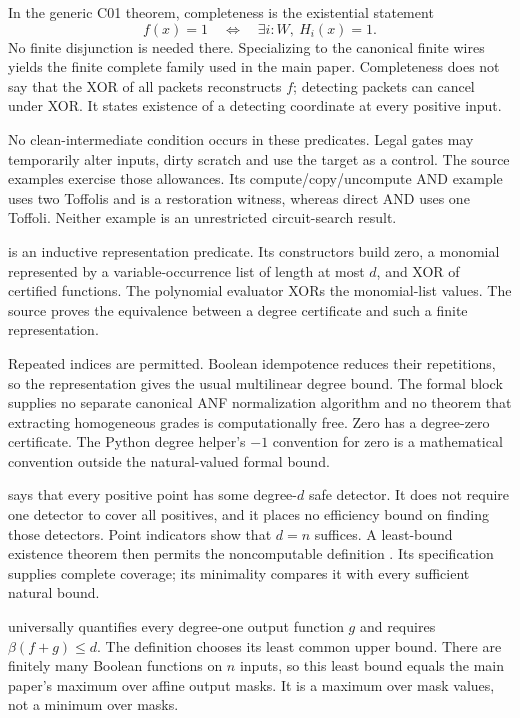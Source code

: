 In the generic C01 theorem, completeness is the existential statement
\[
 f(x)=1\quad\Longleftrightarrow\quad\exists i:W,\ H_i(x)=1.
\]
No finite disjunction is needed there. Specializing to the canonical finite
wires yields the finite complete family used in the main paper. Completeness
does not say that the XOR of all packets reconstructs $f$; detecting packets
can cancel under XOR. It states existence of a detecting coordinate at every
positive input.

No clean-intermediate condition occurs in these predicates. Legal gates may
temporarily alter inputs, dirty scratch and use the target as a control. The
source examples exercise those allowances. Its compute/copy/uncompute AND
example uses two Toffolis and is a restoration witness, whereas direct AND
uses one Toffoli. Neither example is an unrestricted circuit-search result.

 is an inductive representation predicate. Its constructors
build zero, a monomial represented by a variable-occurrence list of length
at most $d$, and XOR of certified functions. The polynomial evaluator XORs
the monomial-list values. The source proves the equivalence between a degree
certificate and such a finite representation.

Repeated indices are permitted. Boolean idempotence reduces their repetitions,
so the representation gives the usual multilinear degree bound. The formal
block supplies no separate canonical ANF normalization algorithm and no theorem
that extracting homogeneous grades is computationally free. Zero has a
degree-zero certificate. The Python degree helper's $-1$ convention for zero
is a mathematical convention outside the natural-valued formal bound.

 says that every positive point has some degree-$d$
safe detector. It does not require one detector to cover all positives, and
it places no efficiency bound on finding those detectors. Point indicators
show that $d=n$ suffices. A least-bound existence theorem then permits the
noncomputable definition . Its specification supplies complete
coverage; its minimality compares it with every sufficient natural bound.

 universally quantifies every degree-one output
function $g$ and requires $\beta(f+g)\le d$. The definition 
chooses its least common upper bound. There are finitely many Boolean functions
on $n$ inputs, so this least bound equals the main paper's maximum over affine
output masks. It is a maximum over mask values, not a minimum over masks.

